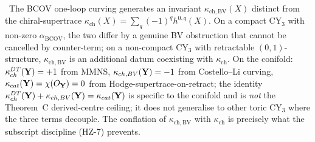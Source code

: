 \begin{remark}
\label{rem:kappa-ch-bv-distinction}
\ClaimStatusProposition\
The BCOV one-loop curving generates an invariant
$\kappa_{\mathrm{ch,BV}}(X)$ distinct from the chiral-supertrace
$\kappa_{\mathrm{ch}}(X) = \sum_q (-1)^q h^{0,q}(X)$. On a compact
CY$_3$ with non-zero $\alpha_{\mathrm{BCOV}}$, the two differ by a
genuine BV obstruction that cannot be cancelled by counter-term; on a
non-compact CY$_3$ with retractable $(0,1)$-structure,
$\kappa_{\mathrm{ch,BV}}$ is an additional datum coexisting with
$\kappa_{\mathrm{ch}}$. On the conifold:
$\kappa_{ch}^{DT}(\mathbf{Y}) = +1$ from MMNS,
$\kappa_{ch,BV}(\mathbf{Y}) = -1$ from Costello--Li curving,
$\kappa_{cat}(\mathbf{Y}) = \chi(O_{\mathbf{Y}}) = 0$ from
Hodge-supertrace-on-retract; the identity
$\kappa_{ch}^{DT}(\mathbf{Y}) + \kappa_{ch,BV}(\mathbf{Y})
= \kappa_{cat}(\mathbf{Y})$ is specific to the conifold and is
\emph{not} the Theorem~C derived-centre ceiling; it does not
generalise to other toric CY$_3$ where the three terms decouple.
The conflation of
$\kappa_{\mathrm{ch,BV}}$ with $\kappa_{\mathrm{ch}}$ is precisely
what the subscript discipline (HZ-7) prevents.
\end{remark}


